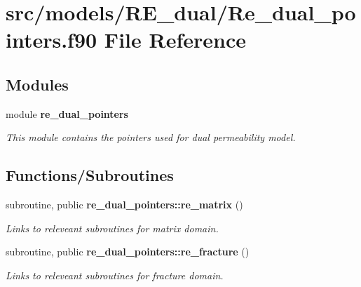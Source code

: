 \section{src/models/\+R\+E\+\_\+dual/\+Re\+\_\+dual\+\_\+pointers.f90 File Reference}
\label{_re__dual__pointers_8f90}
\subsection*{Modules}
\begin{DoxyCompactItemize}
\item 
module {\bf re\+\_\+dual\+\_\+pointers}
\begin{DoxyCompactList}\small\item\em This module contains the pointers used for dual permeability model. \end{DoxyCompactList}\end{DoxyCompactItemize}
\subsection*{Functions/\+Subroutines}
\begin{DoxyCompactItemize}
\item 
subroutine, public {\bf re\+\_\+dual\+\_\+pointers\+::re\+\_\+matrix} ()
\begin{DoxyCompactList}\small\item\em Links to releveant subroutines for matrix domain. \end{DoxyCompactList}\item 
subroutine, public {\bf re\+\_\+dual\+\_\+pointers\+::re\+\_\+fracture} ()
\begin{DoxyCompactList}\small\item\em Links to releveant subroutines for fracture domain. \end{DoxyCompactList}\end{DoxyCompactItemize}
